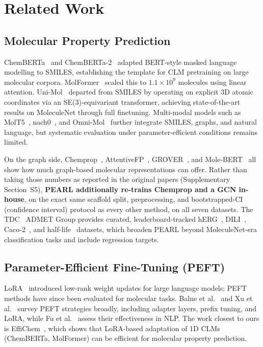 \documentclass[pdflatex,sn-mathphys-num]{sn-jnl}%
\begin{document}
\section{Related Work}\label{sec:related_work}

\subsection{Molecular Property Prediction}\label{sec:related_mpp}
ChemBERTa~\cite{chithrananda2020chemberta} and ChemBERTa-2~\cite{ahmad2022chemberta2} adapted BERT-style masked language modelling to SMILES, establishing the template for CLM pretraining on large molecular corpora. MolFormer~\cite{ross2022molformer} scaled this to $1.1\times10^9$ molecules using linear attention. Uni-Mol~\cite{zhou2023unimol} departed from SMILES by operating on explicit 3D atomic coordinates via an SE(3)-equivariant transformer, achieving state-of-the-art results on MoleculeNet through full finetuning. Multi-modal models such as MolT5~\cite{edwards2022molt5}, nach0~\cite{livne2024nach0}, and Omni-Mol~\cite{hu2025omnimol} further integrate SMILES, graphs, and natural language, but systematic evaluation under parameter-efficient conditions remains limited.

On the graph side, Chemprop~\cite{yang2019chemprop}, AttentiveFP~\cite{xiong2020attentivefp}, GROVER~\cite{rong2020grover}, and Mole-BERT~\cite{xia2023molecbert} all show how much graph-based molecular representations can offer. Rather than taking those numbers as reported in the original papers (Supplementary Section~S5), \textbf{PEARL additionally re-trains Chemprop and a GCN in-house}, on the exact same scaffold split, preprocessing, and bootstrapped-CI (confidence interval) protocol as every other method, on all seven datasets. The TDC~\cite{huang2021tdc} ADMET Group provides curated, leaderboard-tracked hERG~\cite{wang2016herg}, DILI~\cite{xu2019dili}, Caco-2~\cite{wang2016caco2}, and half-life~\cite{obach2008half} datasets, which broaden PEARL beyond MoleculeNet-era classification tasks and include regression targets.

\subsection{Parameter-Efficient Fine-Tuning (PEFT)}\label{sec:related_peft}
LoRA~\cite{hu2021lora} introduced low-rank weight updates for large language models; PEFT methods have since been evaluated for molecular tasks. Balne et al.~\cite{balne2024peft} and Xu et al.~\cite{xu2023peftreview} survey PEFT strategies broadly, including adapter layers, prefix tuning, and LoRA, while Fu et al.~\cite{fu2023effectiveness} assess their effectiveness in NLP. The work closest to ours is EffiChem~\cite{harod2025effichem}, which shows that LoRA-based adaptation of 1D CLMs (ChemBERTa, MolFormer) can be efficient for molecular property prediction.
\end{document}
